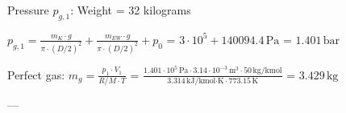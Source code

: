 Pressure \( p_{g,1} \):  
Weight = 32 kilograms  

\( p_{g,1} = \frac{m_K \cdot g}{\pi \cdot (D/2)^2} + \frac{m_{EW} \cdot g}{\pi \cdot (D/2)^2} + p_0 \)  
= \( 3 \cdot 10^5 + 140094.4 \, \text{Pa} \)  
= \( 1.401 \, \text{bar} \)  

Perfect gas:  
\( m_g = \frac{p_1 \cdot V_1}{R/M \cdot T} \)  
= \( \frac{1.401 \cdot 10^5 \, \text{Pa} \cdot 3.14 \cdot 10^{-3} \, \text{m}^3 \cdot 50 \, \text{kg/kmol}}{3.314 \, \text{kJ/kmol·K} \cdot 773.15 \, \text{K}} \)  
= \( 3.429 \, \text{kg} \)  

---